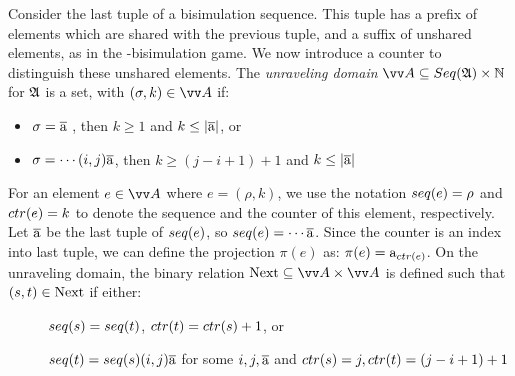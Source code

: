 Consider the last tuple of a bisimulation sequence. 
This tuple has a prefix of elements which are shared with the previous tuple, and a suffix of unshared elements, as in the \FGF-bisimulation game.
We now introduce a counter  to distinguish these unshared elements.
The \emph{unraveling domain}  $\unraveldom{A} \subseteq \Seq{A} \times \mathbb{N}$  for ${\mathfrak{A}}$ is a set, with $(\sigma, k) \in \unraveldom{A}$ if:
\begin{itemize}
  \item $\sigma = \overline{\mathrm{a}}$ ,  then $k \ge 1$ and $k \le |\overline{\mathrm{a}}|$, or
  \item $\sigma = \cdots (i,j) \overline{\mathrm{a}}$, then $k \ge (j-i+1) + 1$ and $k \le |\overline{\mathrm{a}}|$
\end{itemize}
For an element $e \in \unraveldom{A}$  where $e = (\rho, k)$, we use the notation $\seq{e} = \rho$ and $\ctr{e} = k$ to denote the sequence and the counter of this element, respectively.
Let $\overline{\mathrm{a}}$ be the last tuple of $\seq{e}$, so $\seq{e} = \cdots \elemtuplea$.
Since the counter is an index into  last tuple, we can define the projection $\pi(e)$ as: $\pi(e) = \elema_{\ctr{e}}$.
On the unraveling domain, the binary relation $\relNext \subseteq \unraveldom{A} \times \unraveldom{A}$ is defined such that $(s, t) \in \mathrm{Next}$ if either:
\begin{description}
  \item[] $\seq{s} = \seq{t}$, $\ctr{t} = \ctr{s} + 1$, or
  \item[] $\seq{t} = \seq{s} (i,j) \elemtuplea$ for some $i, j, \overline{\mathrm{a}}$ and $\ctr{s} = j, \ctr{t} = (j - i + 1) + 1$
\end{description}
